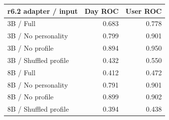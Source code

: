 \begin{tabular}{lrr}
\toprule
r6.2 adapter / input & Day ROC & User ROC \\
\midrule
3B / Full & 0.683 & 0.778 \\
3B / No personality & 0.799 & 0.901 \\
3B / No profile & 0.894 & 0.950 \\
3B / Shuffled profile & 0.432 & 0.550 \\
8B / Full & 0.412 & 0.472 \\
8B / No personality & 0.791 & 0.901 \\
8B / No profile & 0.899 & 0.902 \\
8B / Shuffled profile & 0.394 & 0.438 \\
\bottomrule
\end{tabular}
